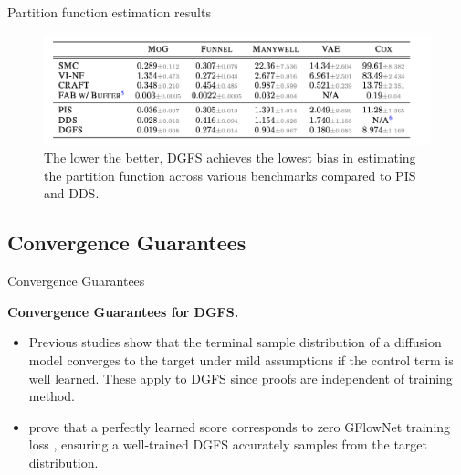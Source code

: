 \documentclass[aspectratio=169,xcolor=dvipsnames]{beamer}
\begin{document}
\begin{frame}[t]{Partition function estimation results}
\footnotesize

\begin{figure}
    \centering
    \includegraphics[width=1.025\textwidth]{figures/partition_fnct.png}
    \caption{The lower the better, DGFS achieves the lowest bias in estimating the partition function across various benchmarks compared to PIS and DDS.}
\end{figure}

\end{frame}

\subsection{Convergence Guarantees}

\begin{frame}[t]{Convergence Guarantees}
\footnotesize

\textbf{Convergence Guarantees for DGFS.}
\begin{itemize}\itemsep2pt
  \item Previous studies \cite{bortoli2022,chen2022,lee2022} show that the terminal sample distribution of a diffusion model converges to the target under mild assumptions if the control term is well learned. These apply to DGFS since proofs are independent of training method.
  \item \cite{zhang2022a} prove that a perfectly learned score corresponds to zero GFlowNet training loss \cite{bengio2021,bengio2023}, ensuring a well-trained DGFS accurately samples from the target distribution.
\end{itemize}


\end{frame}
\end{document}
